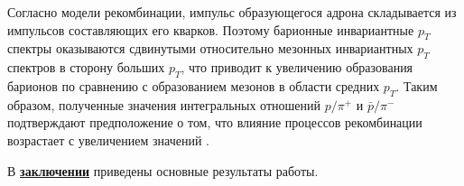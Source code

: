 Согласно модели рекомбинации, импульс образующегося адрона складывается из импульсов составляющих его кварков. Поэтому барионные инвариантные $p_T$ спектры оказываются сдвинутыми относительно мезонных инвариантных $p_T$ спектров в сторону больших $p_T$, что приводит к увеличению образования барионов по сравнению с образованием мезонов в области средних $p_T$. Таким образом, полученные значения интегральных отношений $p/\pi^+$ и $\bar{p}/\pi^-$ подтверждают предположение о том, что влияние процессов рекомбинации возрастает с увеличением значений \Npart.

\FloatBarrier
{}                                  %
В \underline{\textbf{заключении}} приведены основные результаты работы.




